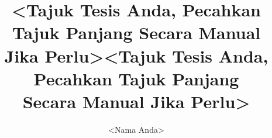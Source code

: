 \documentclass[bahasam,nohyphen]{GayaUKM}
\title{<Tajuk Tesis Anda, Pecahkan Tajuk Panjang Secara Manual\protect\\Jika Perlu>}
\author{<Nama Anda>}
\begin{document}
\makecoverpage

\title{<Tajuk Tesis Anda, Pecahkan Tajuk Panjang\protect\\Secara Manual Jika Perlu>}
\maketitlepage

\frontmatter
\declaration








\tableofcontents\clearpage
\listoffigures\clearpage
\listoftables\clearpage




\mainmatter







\appendix


\end{document}
